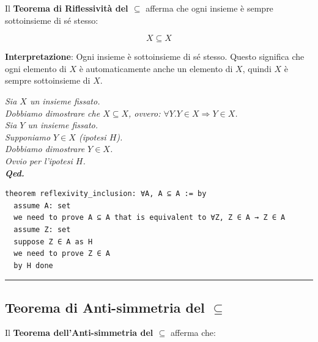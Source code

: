 \documentclass[
  a4paper,
]{article}
\begin{document}
Il \textbf{Teorema di Riflessività del \(\subseteq\)} afferma che ogni
insieme è sempre sottoinsieme di sé stesso:

\[
X \subseteq X
\]

\textbf{Interpretazione}: Ogni insieme è sottoinsieme di sé stesso.
Questo significa che ogni elemento di \(X\) è automaticamente anche un
elemento di \(X\), quindi \(X\) è sempre sottoinsieme di \(X\).

\begin{examplebox}[Dimostrazione]

\emph{Sia \(X\) un insieme fissato.}\\
\emph{Dobbiamo dimostrare che \(X \subseteq X\), ovvero:
\(\forall Y.Y \in X \Rightarrow Y \in X\).}\\
\emph{Sia \(Y\) un insieme fissato.}\\
\emph{Supponiamo \(Y \in X\) (ipotesi \(H\)).}\\
\emph{Dobbiamo dimostrare \(Y \in X\).}\\
\emph{Ovvio per l'ipotesi \(H\).}\\
\textbf{\emph{Qed.}}

\end{examplebox}

\begin{examplebox}

\begin{lstlisting}
theorem reflexivity_inclusion: ∀A, A ⊆ A := by
  assume A: set
  we need to prove A ⊆ A that is equivalent to ∀Z, Z ∈ A → Z ∈ A 
  assume Z: set
  suppose Z ∈ A as H
  we need to prove Z ∈ A
  by H done
\end{lstlisting}

\end{examplebox}

\par\noindent\rule{\linewidth}{0.4pt}\par\vspace{6pt}

\hypertarget{teorema-di-anti-simmetria-del-subseteq}{%
\subsection{\texorpdfstring{Teorema di Anti-simmetria del
\(\subseteq\)}{Teorema di Anti-simmetria del \textbackslash subseteq}}\label{teorema-di-anti-simmetria-del-subseteq}}

Il \textbf{Teorema dell'Anti-simmetria del \(\subseteq\)} afferma che:
\end{document}
